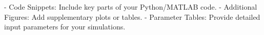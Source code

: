- Code Snippets: Include key parts of your Python/MATLAB code.  
- Additional Figures: Add supplementary plots or tables.  
- Parameter Tables: Provide detailed input parameters for your simulations. 